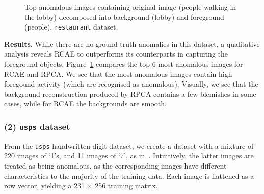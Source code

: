 \begin{figure}[!t]
	\centering
	\caption{Top anomalous images containing original image (people walking in the lobby) decomposed into background (lobby) and foreground (people), {\tt restaurant} dataset.}
	\label{fig:results-restaurant}
\end{figure}

\textbf{Results}.
While there are no ground truth anomalies in this dataset, a qualitative analysis reveals RCAE to outperforms its counterparts in capturing the foreground objects.
Figure~\ref{fig:results-restaurant} compares the top 6 most anomalous images for RCAE and RPCA.
We see that the most anomalous images contain high foregound activity (which are recognised as anomalous).
Visually, we see that the background reconstruction produced by RPCA contains a few blemishes in some cases, while for RCAE the backgrounds are smooth.


\subsubsection{{(2) {\tt usps} dataset}}
From the {\tt usps} handwritten digit dataset,
we create a dataset
with a mixture of 220 images of \lq1\rq s, and 11 images of \lq7\rq, as in~\cite{xu2010robust}.
Intuitively, the latter images are treated as being anomalous, as the corresponding images have different characteristics to the majority of the training data. Each image is flattened as a row vector, yielding a 231 $\times$ 256 training matrix.

